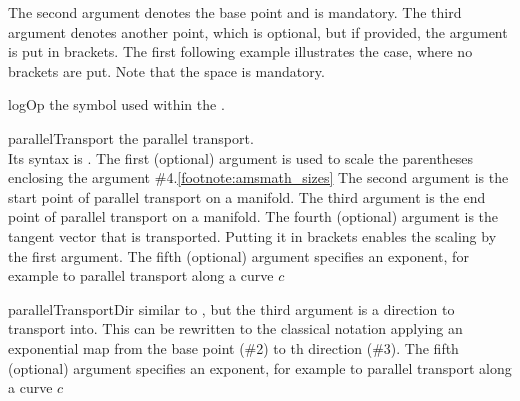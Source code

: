 \documentclass[english,a4paper,DIV=12,parskip=full,oneside]{scrartcl}
\begin{document}
\begin{commandlist}
		The second argument denotes the base point and is mandatory.
		The third argument denotes another point, which is optional, but
		if provided, the argument is put in brackets. The first following example
		illustrates the case, where no brackets are put. Note that the space is
		mandatory.
		\par{}
		\par{}
		\par{}
	\item[logOp] the symbol used within the \codeCommand{\logarithm}.
		\par\mathCodeExample{\logOp}
	\item[parallelTransport] the parallel transport.\\
		Its syntax is .
		The first (optional) argument is used to scale the parentheses enclosing the argument \#4.\cref{footnote:amsmath_sizes}
		The second argument is the start point of parallel transport on a manifold.
		The third argument is the end point of parallel transport on a manifold.
		The fourth (optional) argument is the tangent vector that is transported.
		Putting it in brackets enables the scaling by the first argument.
		The fifth (optional) argument specifies an exponent, for example to parallel transport along a curve $c$
		\par{}
		\par{}
		\par{}
		\par{}
		\par{}
	\item[parallelTransportDir] similar to \codeCommand{\parallelTransport}, but the third
		argument is a direction to transport into. This can be rewritten to the classical notation
		applying an exponential map from the base point (\#2) to th direction (\#3).
		The fifth (optional) argument specifies an exponent, for example to parallel transport along a curve $c$
		\par{}
		\par{}
		\par{}

\end{commandlist}
\end{document}
